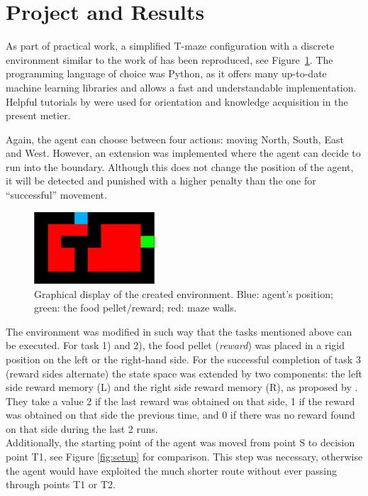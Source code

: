 \documentclass[a4paper]{article}
\begin{document}
	\section{Project and Results}
	\label{sec:project}
	As part of practical work, a simplified T-maze configuration with a discrete environment similar to the work of \cite{NeuralDynaQ} has been reproduced, see Figure~\ref{fig:ui}. The programming language of choice was Python, as it offers many up-to-date machine learning libraries and allows a fast and understandable implementation. Helpful tutorials by \citet{harrison.2019} were used for orientation and knowledge acquisition in the present metier. 
	\par Again, the agent can choose between four actions: moving North, South, East and West. However, an extension was implemented where the agent can decide to run into the boundary. Although this does not change the position of the agent, it will be detected and punished with a higher penalty than the one for ``successful'' movement.\\
	\begin{figure}[t]
		\centering
		\includegraphics[angle=0,width=0.4\textwidth]{./figs/Environment.png}
		\caption{\label{fig:ui} Graphical display of the created environment. Blue: agent's position; green: the food pellet/reward; red: maze walls.}
	\end{figure}
	\par The environment was modified in such way that the tasks mentioned above can be executed. For task 1) and 2), the food pellet (\textit{reward}) was placed in a rigid position on the left or the right-hand side.  For the successful completion of task 3 (reward sides alternate) the state space was extended by two components: the left side reward memory (L) and the right side reward memory (R), as proposed by \citet{NeuralDynaQ}. They take a value 2 if the last reward was obtained on that side, 1 if the reward was obtained on that side the previous time, and 0 if there was no reward found on that side during the last 2 runs. \\
	Additionally, the starting point of the agent was moved from point S to decision point T1, see Figure \ref{fig:setup} for comparison. This step was necessary, otherwise the agent would have exploited the much shorter route without ever passing through points T1 or T2.
\end{document}
